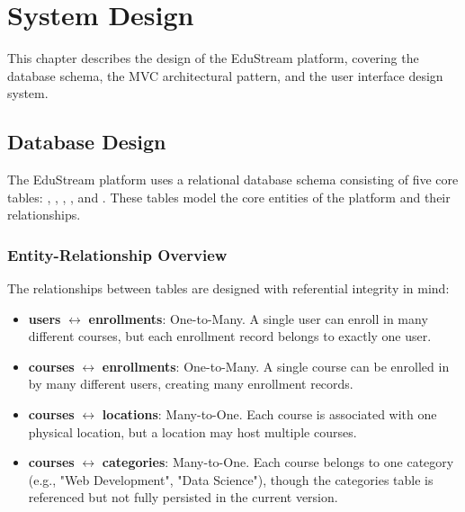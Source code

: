 \documentclass[12pt,a4paper]{report}
\begin{document}
\newpage

\chapter{System Design}

This chapter describes the design of the EduStream platform, covering the database schema, the MVC architectural pattern, and the user interface design system.

\section{Database Design}

The EduStream platform uses a relational database schema consisting of five core tables: , , , , and . These tables model the core entities of the platform and their relationships.

\subsection{Entity-Relationship Overview}

The relationships between tables are designed with referential integrity in mind:

\begin{itemize}
    \item \textbf{users} $\leftrightarrow$ \textbf{enrollments}: One-to-Many. A single user can enroll in many different courses, but each enrollment record belongs to exactly one user.
    \item \textbf{courses} $\leftrightarrow$ \textbf{enrollments}: One-to-Many. A single course can be enrolled in by many different users, creating many enrollment records.
    \item \textbf{courses} $\leftrightarrow$ \textbf{locations}: Many-to-One. Each course is associated with one physical location, but a location may host multiple courses.
    \item \textbf{courses} $\leftrightarrow$ \textbf{categories}: Many-to-One. Each course belongs to one category (e.g., "Web Development", "Data Science"), though the categories table is referenced but not fully persisted in the current version.
\end{itemize}
\end{document}
